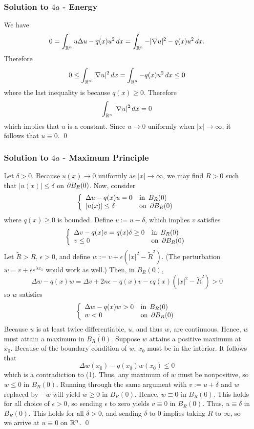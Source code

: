\subsubsection*{Solution to $4a$ - Energy}
We have
\begin{align*}
0 = \int_{\mathbb{R}^{n}}u\Delta u - q(x)u^{2}\, dx = \int_{\mathbb{R}^{n}}-|\nabla u|^{2} - q(x)u^{2}\, dx.
\end{align*}
Therefore
$$0 \leq \int_{\mathbb{R}^{n}}|\nabla u|^{2}\, dx = \int_{\mathbb{R}^{n}}-q(x)u^{2}\, dx \leq 0$$
where the last inequality is because $q(x) \geq 0$. Therefore
$$\int_{\mathbb{R}^{n}}|\nabla u|^{2}\, dx = 0$$ which implies that $u$ is a constant. Since $u \rightarrow 0$ uniformly when $|x| \rightarrow \infty$, it follows
that $u \equiv 0$.
\hfill\qed

\subsubsection*{Solution to $4a$ - Maximum Principle}
Let $\delta> 0$. Because $u(x) \to 0$ uniformly as $|x| \to \infty$, we may find $R>0$ such that $|u(x)| \leq \delta$ on $\partial B_R(0)$. Now, consider
\[
\left\{
\begin{array}{ll}
	\Delta u - q(x) u = 0 & \text{in} \,\,\, B_R(0)\\
	|u(x)| \leq \delta & \text{on} \,\,\, \partial B_R(0)
\end{array}
\right.
\]
where $q(x) \geq 0$ is bounded. Define $v := u - \delta$, which implies $v$ satisfies
\[
\left\{
\begin{array}{ll}
	\Delta v - q(x) v = q(x) \delta \geq 0 & \text{in} \,\,\, B_R(0) \\
	v \leq 0 & \text{on} \,\,\, \partial B_R(0)
\end{array}
\right.
\]
Let $\tilde{R}> R$, $\epsilon >0$, and define $w := v + \epsilon(|x|^2- \tilde{R}^2)$. (The perturbation $w = v + \epsilon e^{\lambda x_1}$ would work as well.) Then, in $B_R(0)$,
$$ \Delta w - q(x) w = \Delta v + 2n\epsilon - q(x) v - \epsilon q(x) (|x|^2 - \tilde{R}^2) > 0$$
so $w$ satisfies
\begin{equation}
\left\{
\begin{array}{ll}
	\Delta w - q(x) w > 0 & \text{in} \,\,\, B_R(0) \\
	w < 0 & \text{on} \,\,\, \partial B_R(0)
\end{array}
\right.
\end{equation}
Because $u$ is at least twice differentiable, $u$, and thus $w$, are continuous. Hence, $w$ must attain a maximum in $\overline{B_R(0)}$. Suppose $w$ attains a positive maximum at $x_0$. Because of the boundary condition of $w$, $x_0$ must be in the interior. It follows that
$$ \Delta w(x_0) - q(x_0) w(x_0) \leq 0 $$
which is a contradiction to (1). Thus, any maximum of $w$ must be nonpositive, so $w \leq 0$ in $B_R(0)$. Running through the same argument with $v := u + \delta$ and $w$ replaced by $-w$ will yield $w \geq 0$ in $B_R(0)$. Hence, $w \equiv 0$ in $B_R(0)$. This holds for all choice of $\epsilon > 0$, so sending $\epsilon$ to zero yields $v \equiv 0$ in $B_R(0)$. Thus, $u \equiv \delta$ in $B_R(0)$. This holds for all $\delta > 0$, and sending $\delta$ to 0 implies taking $R$ to $\infty$, so we arrive at $u \equiv 0$ on $\mathbb{R}^n$.
\hfill\qed


